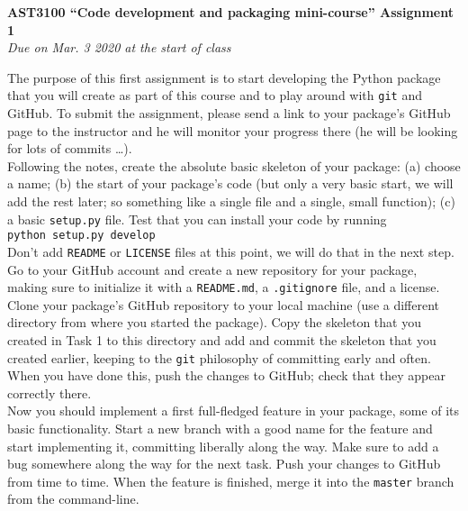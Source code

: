 \documentclass[12pt]{article}
\begin{document}
\begin{center}
{\bf \LARGE AST3100 ``Code development and packaging mini-course'' Assignment 1}\\[7pt]
\emph{Due on Mar. 3 2020  at the start of class}\\[7pt]
\end{center}

The purpose of this first assignment is to start developing the Python
package that you will create as part of this course and to play around
with \texttt{git} and GitHub. To submit the assignment, please send a
link to your package's GitHub page to the instructor and he will
monitor your progress there (he will be looking for lots of commits
\ldots).\\

 Following the notes, create
the absolute basic skeleton of your package: (a) choose a name; (b)
the start of your package's code (but only a very basic start, we will
add the rest later; so something like a single file and a single,
small function); (c) a basic \texttt{setup.py} file. Test that you can
install your code by running\\

\texttt{python setup.py develop}\\

\noindent Don't add \texttt{README} or \texttt{LICENSE} files at this point, we
will do that in the next step.\\

 Go to your
GitHub account and create a new repository for your package, making
sure to initialize it with a \texttt{README.md}, a \texttt{.gitignore}
file, and a license.\\

 Clone your package's GitHub repository to your local
machine (use a different directory from where you started the
package). Copy the skeleton that you created in Task 1 to this
directory and add and commit the skeleton that you created earlier,
keeping to the \texttt{git} philosophy of committing early and
often. When you have done this, push the changes to GitHub; check that
they appear correctly there.\\

 Now
you should implement a first full-fledged feature in your package,
some of its basic functionality. Start a new branch with a good name
for the feature and start implementing it, committing liberally along
the way. Make sure to add a bug somewhere along the way for the next
task. Push your changes to GitHub from time to time. When the feature
is finished, merge it into the \texttt{master} branch from the
command-line.\\
\end{document}
